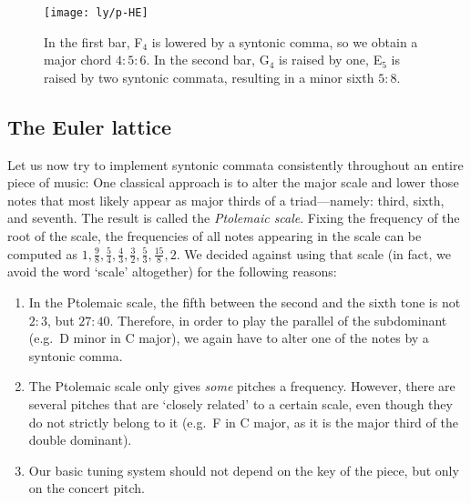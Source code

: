 \documentclass[british,11pt]{scrartcl}
\begin{document}
\begin{figure}\centering
  \texttt{[image: ly/p-HE]}
  \caption{In the first bar, \sharp F$_4$ is lowered by a syntonic comma, so
    we obtain a major chord $4:5:6$. In the second bar, G$_4$ is raised by
    one, \flat E$_5$ is raised by two syntonic commata, resulting in a minor sixth
    $5:8$.}\label{fig:HE}
\end{figure}

\subsection{The Euler lattice}

Let us now try to implement syntonic commata consistently throughout an entire
piece of music: One classical approach is to alter the major scale and lower
those notes that most likely appear as major thirds of a triad—namely: third,
sixth, and seventh. The result is called the \emph{Ptolemaic scale}.  Fixing the
frequency of the root of the scale, the frequencies of all notes appearing in
the scale can be computed as
$1,\frac98,\frac54,\frac43,\frac32,\frac53,\frac{15}8,2$. We decided against
using that scale (in fact, we avoid the word ‘scale’ altogether) for the following
reasons:
\begin{enumerate}
\item In the Ptolemaic scale, the fifth between the second and the sixth tone is
  not $2:3$, but $27:40$. Therefore, in order to play the parallel of the
  subdominant (e.g.\ D minor in C major), we again have to alter one of the
  notes by a syntonic comma.
\item The Ptolemaic scale only gives \emph{some} pitches a frequency. However,
  there are several pitches that are ‘closely related’ to a certain scale, even
  though they do not strictly belong to it (e.g.\ \sharp F in C major, as it
  is the major third of the double dominant).
\item Our basic tuning system should not depend on the key of the piece,
  but only on the concert pitch.
\end{enumerate}
\end{document}
